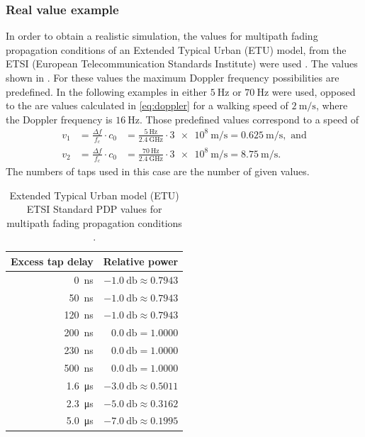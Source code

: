 \subsubsection{Real value example}

In order to obtain a realistic simulation, the values for multipath fading propagation conditions of an Extended Typical Urban (ETU) model, from the ETSI (European Telecommunication Standards Institute) were used \cite{ETSI}. The values shown in . For these  values the maximum Doppler frequency possibilities are predefined. In the following examples in  either \(\SI{5}{\hertz}\) or \(\SI{70}{\hertz}\) were used, opposed to the are values calculated in \eqref{eq:doppler} for a walking speed of \(\SI{2}{\meter\per\second}\), where the Doppler frequency is \(\SI{16}{\hertz}\). Those predefined values correspond to a speed of
\begin{align}
	v_1 &= \frac{\Delta f}{f_c}\cdot c_0 &= \frac{\SI{5}{\hertz}}{\SI{2.4}{\giga\hertz}}\cdot \SI{3e8}{\meter\per\second}= \SI{0.625}{\meter\per\second}, \text{ and} \\
	v_2 &= \frac{\Delta f}{f_c}\cdot c_0 &= \frac{\SI{70}{\hertz}}{\SI{2.4}{\giga\hertz}}\cdot \SI{3e8}{\meter\per\second}= \SI{8.75}{\meter\per\second}.
\end{align}
The numbers of taps used in this case are the number of given values.

\begin{table}[b]
	\centering
	\begin{tabular}{rr}
		\toprule
		\bfseries Excess tap delay & \bfseries Relative power \\
		\midrule
		\SI{   0}{\nano\second} & \(\SI{-1.0}{\decibel} \approx 0.7943\) \\
		\SI{  50}{\nano\second} & \(\SI{-1.0}{\decibel} \approx 0.7943\) \\
		\SI{ 120}{\nano\second} & \(\SI{-1.0}{\decibel} \approx 0.7943\) \\
		\SI{ 200}{\nano\second} & \(\SI{ 0.0}{\decibel} = 1.0000\) \\
		\SI{ 230}{\nano\second} & \(\SI{ 0.0}{\decibel} = 1.0000\) \\
		\SI{ 500}{\nano\second} & \(\SI{ 0.0}{\decibel} = 1.0000\) \\
		\SI{1.6}{\micro\second} & \(\SI{-3.0}{\decibel} \approx 0.5011\) \\
		\SI{2.3}{\micro\second} & \(\SI{-5.0}{\decibel} \approx 0.3162\) \\
		\SI{5.0}{\micro\second} & \(\SI{-7.0}{\decibel} \approx 0.1995\) \\
		\bottomrule
	\end{tabular}
	\caption{Extended Typical Urban model (ETU) ETSI Standard PDP values for multipath fading propagation conditions \cite{ETSI}. \label{tab:etsi-tap-values}}
\end{table}

